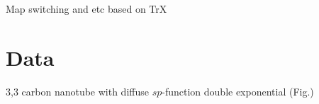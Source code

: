 \documentclass[letterpaper,twocolumn,amsmath,amsfont,amssymb,english,aps,jcp,preprintnumbers,groupaddress,nofootinbib,tightenlines,floatfix]{revtex4}
\theoremstyle{plain}
\theoremstyle{remark}
\theoremstyle{plain}
\begin{document}
Map switching and etc based on TrX

\section{Data} \label{data}

3,3 carbon nanotube with diffuse $sp$-function
double exponential (Fig.)




\end{document}
